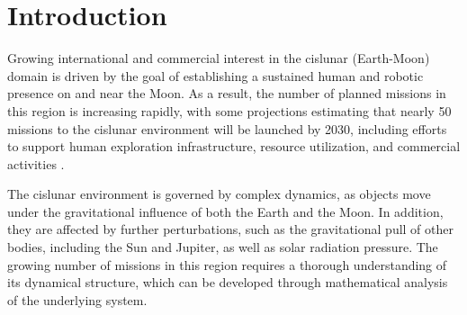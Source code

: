 \section{Introduction} \label{sec:introduction}




        
    Growing international and commercial interest in the cislunar (Earth-Moon) domain is driven by the goal of establishing a sustained human and robotic presence on and near the Moon. 
    As a result, the number of planned missions in this region is increasing rapidly, with some projections estimating that nearly 50 missions to the cislunar environment will be launched by 2030, including efforts to support human exploration infrastructure, resource utilization, and commercial activities \cite{johnson_fly_2022}.
    
    The cislunar environment is governed by complex dynamics, as objects move under the gravitational influence of both the Earth and the Moon. 
    In addition, they are affected by further perturbations, such as the gravitational pull of other bodies, including the Sun and Jupiter, as well as solar radiation pressure. 
    The growing number of missions in this region requires a thorough understanding of its dynamical structure, which can be developed through mathematical analysis of the underlying system.
    
